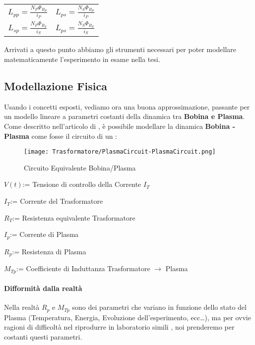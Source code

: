 \begin{de}
	\begin{center}
		\begin{tabular}[t]{c c}
			$ \displaystyle L_{pp} = \frac{N_P  \Phi_{B_P} }{i_P} $ & $ \displaystyle L_{ps} = \frac{N_S  \Phi_{B_P} }{i_P} $ \\[5mm]
			$ \displaystyle L_{sp} = \frac{N_P  \Phi_{B_S} }{i_S} $ & $ \displaystyle L_{ps} = \frac{N_S  \Phi_{B_S} }{i_S} $
		\end{tabular}
	\end{center}
\end{de}

\noindent
Arrivati a questo punto abbiamo gli strumenti necessari per poter modellare matematicamente l'esperimento in esame nella tesi.
\newpage

\subsection{Modellazione Fisica} \label{subsec:ModelloFisico}
Usando i concetti esposti, vediamo ora una buona approssimazione, passante per un modello lineare a parametri costanti della dinamica tra \textbf{Bobina e Plasma}.\\
Come descritto nell'articolo di \cite{TokamakCircuit}, è possibile modellare la dinamica \textbf{Bobina - Plasma} come fosse il circuito di un
:
\begin{figure}[H]
	\centering
	\caption[Circuito Equivalente Bobina/Plasma all'interno di un Tokamak]{Circuito Equivalente Bobina/Plasma}
	\texttt{[image: Trasformatore/PlasmaCircuit-PlasmaCircuit.png]}
\end{figure}
\begin{leg}
	\item $V(t)$\tab:= Tensione di controllo della Corrente $I_T$
	\item $I_T$\tab:= Corrente del Trasformatore
	\item $R_T$\tab:= Resistenza equivalente Trasformatore
	\item $I_p$\tab:= Corrente di Plasma
	\item $R_p$\tab:= Resistenza di Plasma
	\item $M_{Tp}$\tab:= Coefficiente di Induttanza Trasformatore $\rightarrow$ Plasma
\end{leg}
\paragraph{Difformità dalla realtà} Nella realtà $R_p$ e $M_{Tp}$ sono dei parametri che variano in funzione dello stato del Plasma (Temperatura, Energia, Evoluzione dell'esperimento, ecc\ldots), ma per ovvie ragioni di difficoltà nel riprodurre in laboratorio simili \nonLinearita, noi prenderemo per costanti questi parametri.

